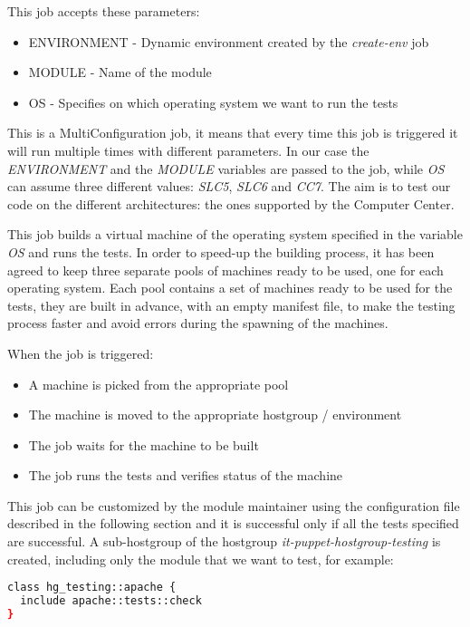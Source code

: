 This job accepts these parameters:

\begin{itemize}
  \item ENVIRONMENT - Dynamic environment created by the \textit{create-env} job
  \item MODULE - Name of the module
  \item OS - Specifies on which operating system we want to run the tests
\end{itemize}

This is a MultiConfiguration job, it means that every time this job is
triggered it will run multiple times with different parameters. In our
case the \textit{ENVIRONMENT} and the \textit{MODULE} variables are passed
to the job, while \textit{OS} can assume three different values:
\textit{SLC5}, \textit{SLC6} and \textit{CC7}. The aim is to test our code
on the different architectures: the ones supported by the Computer
Center.

This job builds a virtual machine of the operating system specified in the
variable \textit{OS} and runs the tests. In order to speed-up the building
process, it has been agreed to keep three separate pools of machines ready
to be used, one for each operating system. Each pool contains a set of
machines ready to be used for the tests, they are built in advance, with
an empty manifest file, to make the testing process faster and avoid
errors during the spawning of the machines.

When the job is triggered:

\begin{itemize}
  \item A machine is picked from the appropriate pool
  \item The machine is moved to the appropriate hostgroup / environment
  \item The job waits for the machine to be built
  \item The job runs the tests and verifies status of the machine
\end{itemize}

This job can be customized by the module maintainer using the
configuration file described in the following section and it is successful
only if all the tests specified are successful. A sub-hostgroup of the
hostgroup \textit{it-puppet-hostgroup-testing} is created, including only
the module that we want to test, for example:

\begin{lstlisting}[language=bash, frame=single]
class hg_testing::apache { 
  include apache::tests::check
}

\end{lstlisting}

